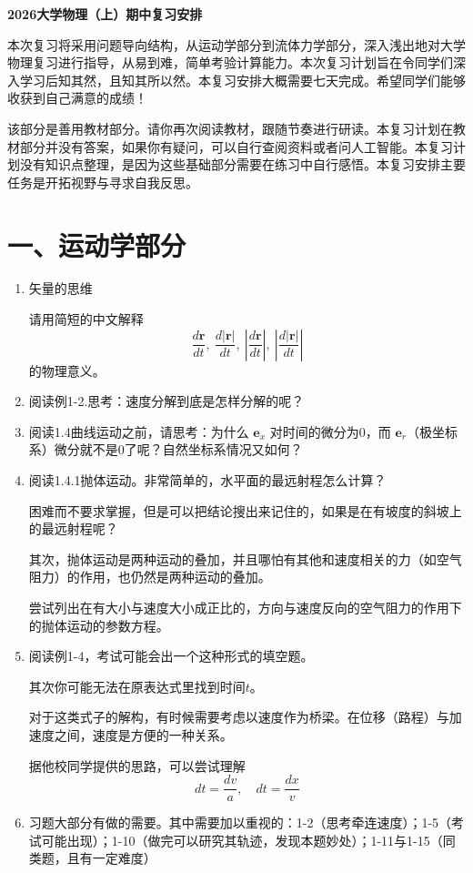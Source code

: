\documentclass[12pt,a4paper]{article}
\begin{document}
\begin{center}
\LARGE\bfseries 2026大学物理（上）期中复习安排
\end{center}

本次复习将采用问题导向结构，从运动学部分到流体力学部分，深入浅出地对大学物理复习进行指导，从易到难，简单考验计算能力。本次复习计划旨在令同学们深入学习后知其然，且知其所以然。本复习安排大概需要七天完成。希望同学们能够收获到自己满意的成绩！

\vspace{1em}

该部分是善用教材部分。请你再次阅读教材，跟随节奏进行研读。本复习计划在教材部分并没有答案，如果你有疑问，可以自行查阅资料或者问人工智能。本复习计划没有知识点整理，是因为这些基础部分需要在练习中自行感悟。本复习安排主要任务是开拓视野与寻求自我反思。

\section{一、运动学部分}
\begin{enumerate}[label=\arabic*.,leftmargin=*]
    \item 矢量的思维
    
    请用简短的中文解释
    \[
    \frac{d\boldsymbol{r}}{dt},\ \frac{d|\boldsymbol{r}|}{dt},\ \left|\frac{d\boldsymbol{r}}{dt}\right|,\ \left|\frac{d|\boldsymbol{r}|}{dt}\right|
    \]
    的物理意义。

    \item 阅读例1-2.思考：速度分解到底是怎样分解的呢？

    \item 阅读1.4曲线运动之前，请思考：为什么 $\boldsymbol{e}_x$ 对时间的微分为0，而 $\boldsymbol{e}_r$（极坐标系）微分就不是0了呢？自然坐标系情况又如何？

    \item 阅读1.4.1抛体运动。非常简单的，水平面的最远射程怎么计算？
    
    困难而不要求掌握，但是可以把结论搜出来记住的，如果是在有坡度的斜坡上的最远射程呢？
    
    其次，抛体运动是两种运动的叠加，并且哪怕有其他和速度相关的力（如空气阻力）的作用，也仍然是两种运动的叠加。
    
    尝试列出在有大小与速度大小成正比的，方向与速度反向的空气阻力的作用下的抛体运动的参数方程。

    \item 阅读例1-4，考试可能会出一个这种形式的填空题。
    
    其次你可能无法在原表达式里找到时间$t$。
    
    对于这类式子的解构，有时候需要考虑以速度作为桥梁。在位移（路程）与加速度之间，速度是方便的一种关系。
    
    据他校同学提供的思路，可以尝试理解
    \[
    dt=\frac{dv}{a},\quad dt=\frac{dx}{v}
    \]

    \item 习题大部分有做的需要。其中需要加以重视的：1-2（思考牵连速度）；1-5（考试可能出现）；1-10（做完可以研究其轨迹，发现本题妙处）；1-11与1-15（同类题，且有一定难度）
\end{enumerate}
\end{document}
